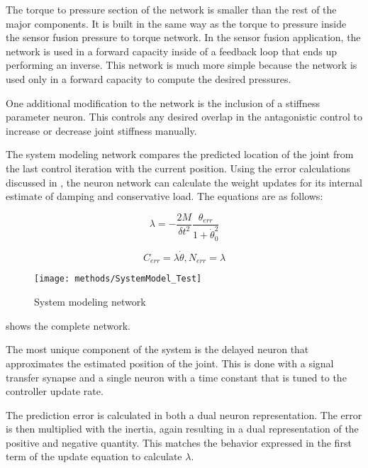 
The torque to pressure section of the network is smaller than the rest of the 
major components. It is built in the same way as the torque to pressure inside
the sensor fusion pressure to torque network. In the sensor fusion application,
the network is used in a forward capacity inside of a feedback loop that ends
up performing an inverse. This network is much more simple because the network
is used only in a forward capacity to compute the desired pressures.

One additional modification to the network is the inclusion of a stiffness
parameter neuron. This controls any desired overlap in the antagonistic control
to increase or decrease joint stiffness manually.


The system modeling network compares the predicted location of the joint from 
the last control iteration with the current position. Using the error 
calculations discussed in , the neuron network
can calculate the weight updates for its internal estimate of damping and 
conservative load. The equations are as follows:

\begin{equation}
\lambda 
=
- \dfrac{2M}{\delta t^{2}} \dfrac{\theta_{err}}{1 + \dot{\theta}_{0}^{2}}
\end{equation}

\begin{equation}
C_{err} = \lambda \dot{\theta}, N_{err} = \lambda
\end{equation}

\begin{figure}
\centering
\texttt{[image: methods/SystemModel\_Test]}
\caption{System modeling network}
\label{fig:SystemModelNetwork}
\end{figure}

 shows the complete network.



The most unique component of the system is the delayed neuron that approximates
the estimated position of the joint. This is done with a signal transfer
synapse and a single neuron with a time constant that is tuned to the controller
update rate.


The prediction error is calculated in both a dual neuron representation. The
error is then multiplied with the inertia, again resulting in a dual 
representation of the positive and negative quantity. This matches the behavior
expressed in the first term of the update equation to calculate $\lambda$.

